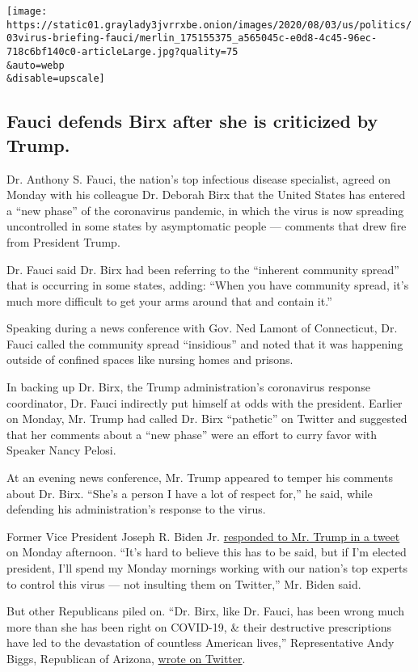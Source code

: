 \texttt{[image: https://static01.graylady3jvrrxbe.onion/images/2020/08/03/us/politics/03virus-briefing-fauci/merlin\_175155375\_a565045c-e0d8-4c45-96ec-718c6bf140c0-articleLarge.jpg?quality=75\\\&auto=webp\\\&disable=upscale]}

\hypertarget{fauci-defends-birx-after-she-is-criticized-by-trump}{%
\subsection{Fauci defends Birx after she is criticized by
Trump.}\label{fauci-defends-birx-after-she-is-criticized-by-trump}}

Dr. Anthony S. Fauci, the nation's top infectious disease specialist,
agreed on Monday with his colleague Dr. Deborah Birx that the United
States has entered a ``new phase'' of the coronavirus pandemic, in which
the virus is now spreading uncontrolled in some states by asymptomatic
people --- comments that drew fire from President Trump.

Dr. Fauci said Dr. Birx had been referring to the ``inherent community
spread'' that is occurring in some states, adding: ``When you have
community spread, it's much more difficult to get your arms around that
and contain it.''

Speaking during a news conference with Gov. Ned Lamont of Connecticut,
Dr. Fauci called the community spread ``insidious'' and noted that it
was happening outside of confined spaces like nursing homes and prisons.

In backing up Dr. Birx, the Trump administration's coronavirus response
coordinator, Dr. Fauci indirectly put himself at odds with the
president. Earlier on Monday, Mr. Trump had called Dr. Birx ``pathetic''
on Twitter and suggested that her comments about a ``new phase'' were an
effort to curry favor with Speaker Nancy Pelosi.

At an evening news conference, Mr. Trump appeared to temper his comments
about Dr. Birx. ``She's a person I have a lot of respect for,'' he said,
while defending his administration's response to the virus.

Former Vice President Joseph R. Biden Jr.
\href{https://twitter.com/JoeBiden/status/1290350721515139072}{responded
to Mr. Trump in a tweet} on Monday afternoon. ``It's hard to believe
this has to be said, but if I'm elected president, I'll spend my Monday
mornings working with our nation's top experts to control this virus ---
not insulting them on Twitter,'' Mr. Biden said.

But other Republicans piled on. ``Dr. Birx, like Dr. Fauci, has been
wrong much more than she has been right on COVID-19, \& their
destructive prescriptions have led to the devastation of countless
American lives,'' Representative Andy Biggs, Republican of Arizona,
\href{https://twitter.com/RepAndyBiggsAZ/status/1290297517582610433?s=20}{wrote
on Twitter}.


